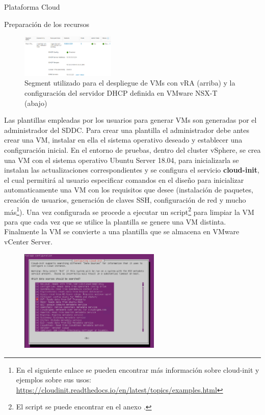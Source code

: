 \begin{subsection}{Plataforma Cloud}
\begin{subsubsection}{Preparación de los recursos}
    \begin{figure}[h]
        \centering
        \includegraphics[width=0.4\textwidth]{imaxes/pruebaconcepto/vrealize/segment-MGMT.png}
        \caption{Segment utilizado para el despliegue de VMs con vRA (arriba) y la configuración del servidor DHCP definida en VMware NSX-T (abajo)}
        \label{fig:topology-segment-mgmt}
    \end{figure}
    \FloatBarrier
    Las plantillas empleadas por los usuarios para generar VMs son generadas por el administrador del SDDC. Para crear una plantilla el administrador debe antes crear una VM, instalar en ella el sistema operativo deseado y establecer una configuración inicial. En el entorno de pruebas, dentro del cluster vSphere, se crea una VM con el sistema operativo Ubuntu Server 18.04, para inicializarla se instalan las actualizaciones correspondientes y se configura el servicio \textbf{cloud-init}, el cual permitirá al usuario especificar comandos en el diseño para inicializar automaticamente una VM con los requisitos que desee (instalación de paquetes, creación de usuarios, generación de claves SSH, configuración de red y mucho más\footnote{En el siguiente enlace se pueden encontrar más información sobre cloud-init y ejemplos sobre sus usos: \url{https://cloudinit.readthedocs.io/en/latest/topics/examples.html}}). Una vez configurada se procede a ejecutar un script\footnote{El script se puede encontrar en el anexo .} para limpiar la VM para que cada vez que se utilice la plantilla se genere una VM distinta. Finalmente la VM se convierte a una plantilla que se almacena en VMware vCenter Server. 
    \begin{figure}[h]
        \centering
        \includegraphics[width=0.6\textwidth]{imaxes/pruebaconcepto/vrealize/install-cloud-init.png}

\end{figure}
\end{subsubsection}
\end{subsection}

